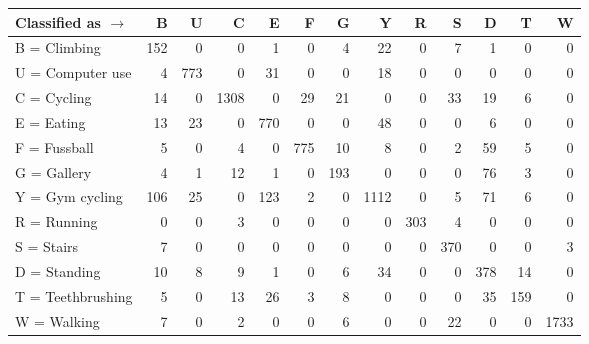 \begin{tabular}{lrrrrrrrrrrrr}
\toprule
Classified as $\rightarrow$ &    B &    U &     C &    E &    F &    G &     Y &    R &    S &    D &    T &     W \\
\midrule
B = Climbing      &  152 &    0 &     0 &    1 &    0 &    4 &    22 &    0 &    7 &    1 &    0 &     0 \\
U = Computer use  &    4 &  773 &     0 &   31 &    0 &    0 &    18 &    0 &    0 &    0 &    0 &     0 \\
C = Cycling       &   14 &    0 &  1308 &    0 &   29 &   21 &     0 &    0 &   33 &   19 &    6 &     0 \\
E = Eating        &   13 &   23 &     0 &  770 &    0 &    0 &    48 &    0 &    0 &    6 &    0 &     0 \\
F = Fussball      &    5 &    0 &     4 &    0 &  775 &   10 &     8 &    0 &    2 &   59 &    5 &     0 \\
G = Gallery       &    4 &    1 &    12 &    1 &    0 &  193 &     0 &    0 &    0 &   76 &    3 &     0 \\
Y = Gym cycling   &  106 &   25 &     0 &  123 &    2 &    0 &  1112 &    0 &    5 &   71 &    6 &     0 \\
R = Running       &    0 &    0 &     3 &    0 &    0 &    0 &     0 &  303 &    4 &    0 &    0 &     0 \\
S = Stairs        &    7 &    0 &     0 &    0 &    0 &    0 &     0 &    0 &  370 &    0 &    0 &     3 \\
D = Standing      &   10 &    8 &     9 &    1 &    0 &    6 &    34 &    0 &    0 &  378 &   14 &     0 \\
T = Teethbrushing &    5 &    0 &    13 &   26 &    3 &    8 &     0 &    0 &    0 &   35 &  159 &     0 \\
W = Walking       &    7 &    0 &     2 &    0 &    0 &    6 &     0 &    0 &   22 &    0 &    0 &  1733 \\
\bottomrule
\end{tabular}
